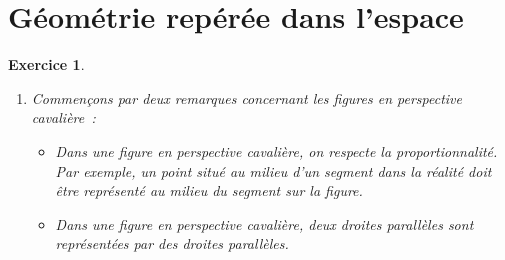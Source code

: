 \documentclass[10pt]{article}
\newtheorem{exo}{Exercice}
\begin{document}
\newpage

\section{Géométrie repérée dans l'espace}










\begin{exo}


\begin{enumerate}

\item Commençons par deux remarques concernant les figures en perspective cavalière~:
\begin{itemize}
\item[\textbullet] Dans une figure en perspective cavalière, on respecte la proportionnalité. Par exemple, un point situé au milieu d'un segment dans la réalité doit être représenté au milieu du segment sur la figure.
\item[\textbullet] Dans une figure en perspective cavalière, deux droites parallèles sont représentées par des droites parallèles.
\end{itemize}



\end{enumerate}
\end{exo}
\end{document}
